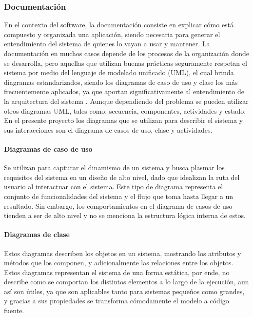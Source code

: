 \subsubsection{Documentación}
En el contexto del software, la documentación consiste en explicar cómo está compuesto y organizada una aplicación, siendo necesaria para generar el entendimiento del sistema de quienes lo vayan a usar y mantener. La documentación en muchos casos depende de los procesos de la organización donde se desarrolla, pero aquellas que utilizan buenas prácticas seguramente respetan el sistema por medio del lenguaje de modelado unificado (UML), el cual brinda diagramas estandarizados, siendo los diagramas de caso de uso y clase los más frecuentemente aplicados, ya que aportan significativamente al entendimiento de la arquitectura del sistema \parencite{Rumbaugh2004}. Aunque dependiendo del problema se pueden utilizar otros diagramas UML, tales como: secuencia, componentes, actividades y estado. 
En el presente proyecto los diagramas que se utilizan para describir el sistema y sus interacciones son el diagrama de casos de uso, clase y actividades.

\paragraph{Diagramas de caso de uso} Se utilizan para capturar el dinamismo de un sistema y busca plasmar los requisitos del sistema en un diseño de alto nivel, dado que idealizan la ruta del usuario al interactuar con el sistema. Este tipo de diagrama representa el conjunto de funcionalidades del sistema y el flujo que toma hasta llegar a un resultado. Sin embargo, los comportamientos en el diagrama de casos de uso tienden a ser de alto nivel y no se menciona la estructura lógica interna de estos. 

\paragraph{Diagramas de clase} Estos diagramas describen los objetos en un sistema, mostrando los atributos y métodos que los componen, y adicionalmente las relaciones entre los objetos. Estos diagramas representan el sistema de una forma estática, por ende, no describe como se comportan los distintos elementos a lo largo de la ejecución, aun así son útiles, ya que son aplicables tanto para sistemas pequeños como grandes, y gracias a sus propiedades se transforma cómodamente el modelo a código fuente.

